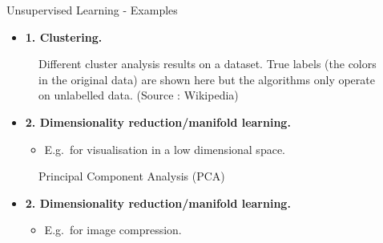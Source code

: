 \begin{vbframe}{Unsupervised Learning - Examples}
  \begin{itemize}
    \item[] \textbf{1. Clustering.}
  \end{itemize}
  \begin{figure}
    \centering
    \caption{\footnotesize{Different cluster analysis results on a dataset. True labels (the colors in the original data) are shown here but the algorithms only operate on unlabelled data. (Source : Wikipedia)}}
  \end{figure}
\framebreak
  \begin{itemize}
    \item[] \textbf{2. Dimensionality reduction/manifold learning.}
    \ \begin{itemize}
    \item E.g.~for  visualisation in a low dimensional space.
    \end{itemize}
  \end{itemize}

    \begin{figure}
        \caption{\footnotesize{Principal Component Analysis (PCA)}}
    \end{figure}

\framebreak
  \begin{itemize}
    \item[] \textbf{2. Dimensionality reduction/manifold learning.}
    \ \begin{itemize}
    \item E.g.~for  image compression.
    \end{itemize}
  \end{itemize}


\end{vbframe}

